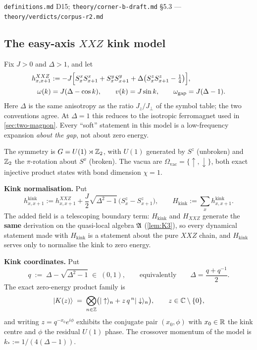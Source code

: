 %
{\texttt{definitions.md} D15; \texttt{theory/corner-b-draft.md} \S5.3}%
{---}%
{\texttt{theory/verdicts/corpus-r2.md}}

\subsection{The easy-axis $XXZ$ kink model}

\begin{definition}
\label{def:kink-model}
Fix $J>0$ and $\Delta>1$, and let
\begin{align}
  h^{XXZ}_{x,x+1}&:=-J\Bigl[S^x_xS^x_{x+1}+S^y_xS^y_{x+1}
    +\Delta\bigl(S^z_xS^z_{x+1}-\tfrac14\bigr)\Bigr],
  \label{eq:hxxz}\\
  \omega(k)&=J(\Delta-\cos k),\qquad v(k)=J\sin k,\qquad
  \omega_{\mathrm{gap}}=J(\Delta-1).
  \label{eq:dispersion}
\end{align}
Here $\Delta$ is the same anisotropy as the ratio $J_z/J_\perp$ of the symbol
table; the two conventions agree. At $\Delta=1$ this reduces to the isotropic
ferromagnet used in \cref{sec:two-magnon}. Every ``soft'' statement in this
model is a low-frequency expansion \emph{about the gap}, not about zero energy.

The symmetry is $G=U(1)\rtimes\mathbb{Z}_2$, with $U(1)$ generated by $S^z$ (unbroken)
and $\mathbb{Z}_2$ the $\pi$-rotation about $S^x$ (broken). The vacua are
$\Omega_{\mathrm{vac}}=\{\uparrow,\downarrow\}$, both exact injective product
states with bond dimension $\chi=1$.

\smallskip
\noindent\textbf{Kink normalisation.} Put
\begin{equation}
  h^{\mathrm{kink}}_{x,x+1}:=h^{XXZ}_{x,x+1}
  +\frac{J}{2}\sqrt{\Delta^2-1}\,\bigl(S^z_x-S^z_{x+1}\bigr),
  \qquad
  H_{\mathrm{kink}}:=\sum_x h^{\mathrm{kink}}_{x,x+1}.
  \label{eq:hkink}
\end{equation}
The added field is a telescoping boundary term:
$H_{\mathrm{kink}}$ and $H_{XXZ}$ generate the \textbf{same} derivation on the
quasi-local algebra $\mathfrak{A}$ (\cref{lem:K3}), so every dynamical statement made
with $H_{\mathrm{kink}}$ is a statement about the pure $XXZ$ chain, and
$H_{\mathrm{kink}}$ serves only to normalise the kink to zero energy.

\smallskip
\noindent\textbf{Kink coordinates.} Put
\begin{equation}
  q\;:=\;\Delta-\sqrt{\Delta^2-1}\;\in\;(0,1),
  \qquad\text{equivalently}\qquad
  \Delta=\frac{q+q^{-1}}{2}.
  \label{eq:qdef}
\end{equation}
The exact zero-energy product family is
\begin{equation}
  |K(z)\rangle\;=\;\bigotimes_{n\in\mathbb{Z}}
  \bigl(|\uparrow\rangle_n+z\,q^{\,n}|\downarrow\rangle_n\bigr),
  \qquad z\in\mathbb{C}\setminus\{0\},
  \label{eq:kink-family}
\end{equation}
and writing $z=q^{-x_0}e^{i\phi}$ exhibits the conjugate pair $(x_0,\phi)$ with
$x_0\in\mathbb{R}$ the kink centre and $\phi$ the residual $U(1)$ phase. The crossover
momentum of the model is $k_*:=1/(4(\Delta-1))$.
\end{definition}

